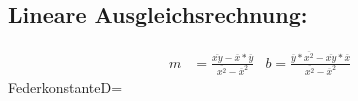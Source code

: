     \subsection{Lineare Ausgleichsrechnung:}
    \begin{align}\label{eq.linreg}
        m &= \frac{\overline{xy}-\overline{x}* \overline{y}}{\overline{x^2}-\overline{x}^2} 
        &b = \frac{\overline{y}* \overline{x^2}-\overline{xy}* \overline{x}}{\overline{x^2}- \overline{x}^2}
    \end{align}
    Federkonstante\:D\:=\:

    
    


